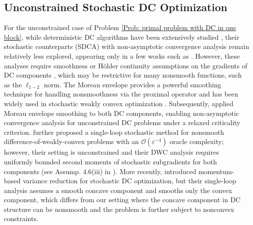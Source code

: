 \documentclass{article}
\theoremstyle{plain}
\theoremstyle{definition}
\theoremstyle{remark}
\newcommand{\calO}{\mathcal{O}}
\numberwithin{equation}{section}
\begin{document}
\subsection{Unconstrained Stochastic DC Optimization}
\label{app:related_work_stochastic_dc}
For the unconstrained case of Problem \eqref{Prob: primal problem with DC in one block}, while deterministic DC algorithms have been extensively studied \citep{le2018dc}, their stochastic counterparts (SDCA) with non-asymptotic convergence analysis remain relatively less explored, appearing only in a few works such as \citep{nitanda2017stochastic,xu2019stochastic}. However, these analyses require smoothness \citep{nitanda2017stochastic} or H\"{o}lder continuity assumptions on the gradients of DC components \citep{xu2019stochastic}, which may be restrictive for many nonsmooth functions, such as the \(\ell_{1-2}\) norm. The Moreau envelope provides a powerful smoothing technique for handling nonsmoothness via the proximal operator and has been widely used in stochastic weakly convex optimization \citep{davis2019stochastic}. Subsequently, \citet{sun2023algorithms} applied Moreau envelope smoothing to both DC components, enabling non-asymptotic convergence analysis for unconstrained DC problems under a relaxed criticality criterion. \citet{hu2024single} further proposed a single-loop stochastic method for nonsmooth difference-of-weakly-convex problems with an $\calO(\varepsilon^{-4})$ oracle complexity; however, their setting is unconstrained and their DWC analysis requires uniformly bounded second moments of stochastic subgradients for both components (see Assump. 4.6(iii) in \citet{hu2024single}). More recently, \citet{chayti2025stochastic} introduced momentum-based variance reduction for stochastic DC optimization, but their single-loop analysis assumes a smooth concave component and smooths only the convex component, which differs from our setting where the concave component in DC structure can be nonsmooth and the problem is further subject to nonconvex constraints.
\end{document}
